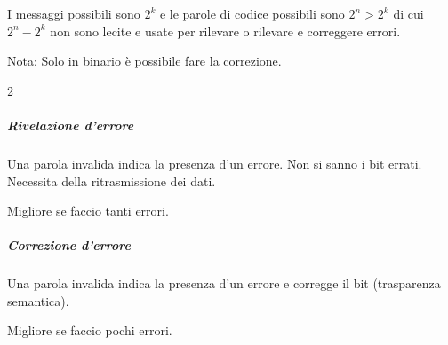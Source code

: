 I messaggi possibili sono $2^k$ e le parole di codice possibili sono $2^n>2^k$ di cui $2^n-2^k$ non sono lecite e usate per rilevare o rilevare e correggere errori.

Nota: Solo in binario è possibile fare la correzione.
\begin{paracol}{2}
	\subparagraph{Rivelazione d'errore} Una parola invalida indica la presenza d'un errore. Non si sanno i bit errati. Necessita della ritrasmissione dei dati.

	Migliore se faccio tanti errori.
	\switchcolumn
	\subparagraph{Correzione d'errore} Una parola invalida indica la presenza d'un errore e corregge il bit (trasparenza semantica).

	Migliore se faccio pochi errori.
\end{paracol}
